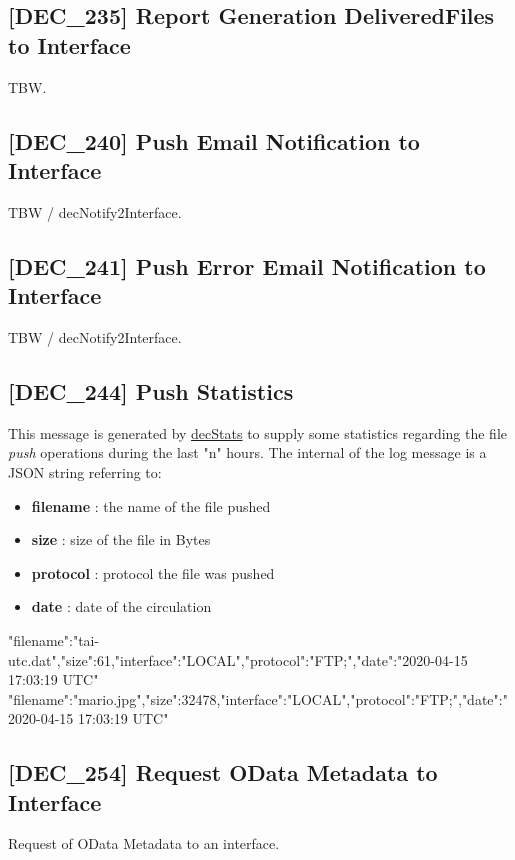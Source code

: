 \documentclass[dec_sum_main.tex]{subfiles}
\begin{document}
\label{DEC235}
\subsection{[DEC\_235] Report Generation DeliveredFiles to Interface}
TBW.

\label{DEC240}
\subsection{[DEC\_240] Push Email Notification to Interface}
TBW / decNotify2Interface.

\label{DEC241}
\subsection{[DEC\_241] Push Error Email Notification to Interface}
TBW / decNotify2Interface.

\label{DEC244}
\subsection{[DEC\_244] Push Statistics}
This message is generated by \hyperref[decStats]{decStats} to supply some statistics regarding the file \textit{push} operations during the last "n" hours.\newline
The internal of the log message is a JSON string referring to:
\begin{itemize}
	\item \textbf{filename} : the name of the file pushed
	\item \textbf{size} : size of the file in Bytes
	\item \textbf{protocol} : protocol the file was pushed
	\item \textbf{date} : date of the circulation
\end{itemize}
\begin{verbnobox}[\fontsize{8pt}{8pt}\selectfont]
{"filename":"tai-utc.dat","size":61,"interface":"LOCAL","protocol":"FTP;","date":"2020-04-15 17:03:19 UTC"}
{"filename":"mario.jpg","size":32478,"interface":"LOCAL","protocol":"FTP;","date":"2020-04-15 17:03:19 UTC"}
\end{verbnobox}

\label{DEC254}
\subsection{[DEC\_254] Request OData Metadata to Interface}
Request of OData Metadata to an interface.

\label{DEC255}
\end{document}
